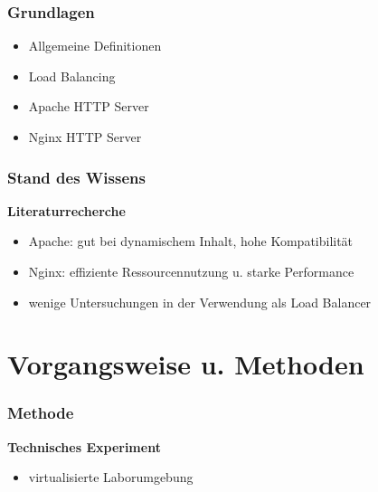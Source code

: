 \documentclass{beamer}
\begin{document}
\begin{frame}
    \frametitle{Grundlagen}
    \begin{itemize}
        \item Allgemeine Definitionen
        \item Load Balancing
        \item Apache HTTP Server
        \item Nginx HTTP Server
    \end{itemize}
\end{frame}

\begin{frame}
    \frametitle{Stand des Wissens}
    \textbf{Literaturrecherche}
    \begin{itemize}
        \item Apache: gut bei dynamischem Inhalt, hohe Kompatibilität
        \item Nginx: effiziente Ressourcennutzung u. starke Performance
        \item wenige Untersuchungen in der Verwendung als Load Balancer
    \end{itemize}
\end{frame}

\section{Vorgangsweise u. Methoden}

\begin{frame}
    \frametitle{Methode}
    \textbf{Technisches Experiment}
    \begin{itemize}
        \item virtualisierte Laborumgebung
    \end{itemize}
\end{frame}
\end{document}
